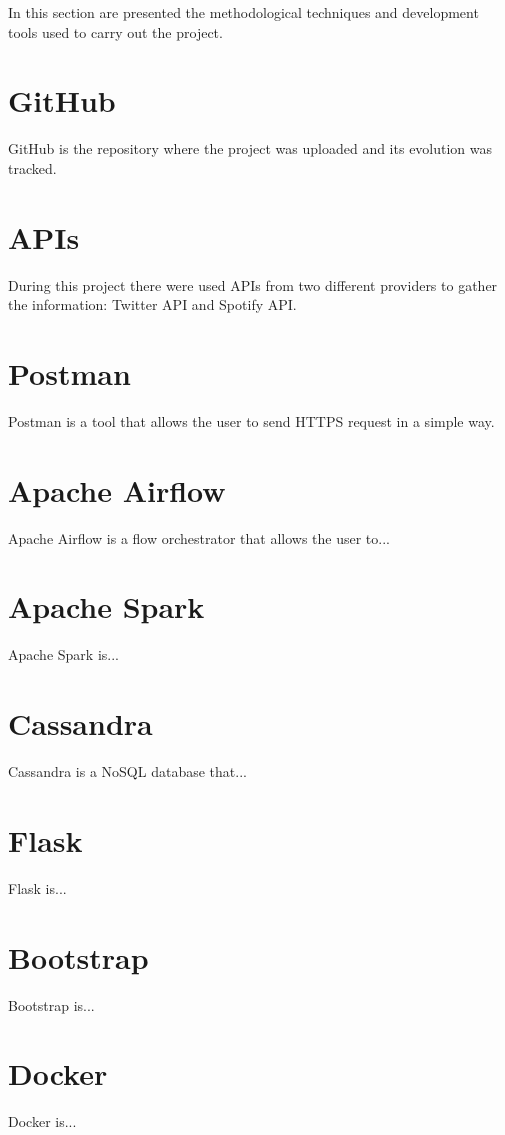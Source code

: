 
\nonzeroparskip In this section are presented the methodological techniques and development tools used to carry out the project.

\section{GitHub}

\nonzeroparskip GitHub is the repository where the project was uploaded and its evolution was tracked.

\section{APIs}

\nonzeroparskip During this project there were used APIs from two different providers to gather the information: Twitter API and Spotify API.

\section{Postman}

\nonzeroparskip Postman is a tool that allows the user to send HTTPS request in a simple way.

\section{Apache Airflow}

\nonzeroparskip Apache Airflow is a flow orchestrator that allows the user to...

\section{Apache Spark}

\nonzeroparskip Apache Spark is...

\section{Cassandra}

\nonzeroparskip Cassandra is a NoSQL database that...

\section{Flask}

\nonzeroparskip Flask is...

\section{Bootstrap}

\nonzeroparskip Bootstrap is...

\section{Docker}

\nonzeroparskip Docker is...
